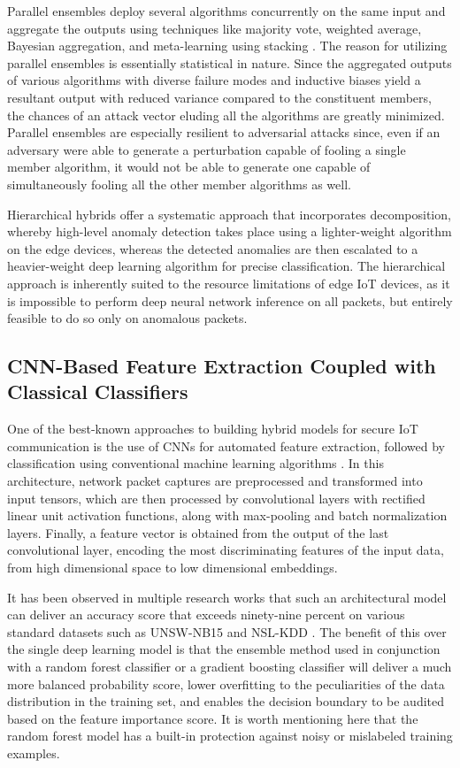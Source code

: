 \documentclass[12pt]{article}
\begin{document}
Parallel ensembles deploy several algorithms concurrently on the same input and aggregate the outputs using techniques like majority vote, weighted average, Bayesian aggregation, and meta-learning using stacking \cite{mirsky2018kitsune}. The reason for utilizing parallel ensembles is essentially statistical in nature. Since the aggregated outputs of various algorithms with diverse failure modes and inductive biases yield a resultant output with reduced variance compared to the constituent members, the chances of an attack vector eluding all the algorithms are greatly minimized. Parallel ensembles are especially resilient to adversarial attacks since, even if an adversary were able to generate a perturbation capable of fooling a single member algorithm, it would not be able to generate one capable of simultaneously fooling all the other member algorithms as well.

Hierarchical hybrids offer a systematic approach that incorporates decomposition, whereby high-level anomaly detection takes place using a lighter-weight algorithm on the edge devices, whereas the detected anomalies are then escalated to a heavier-weight deep learning algorithm for precise classification. The hierarchical approach is inherently suited to the resource limitations of edge IoT devices, as it is impossible to perform deep neural network inference on all packets, but entirely feasible to do so only on anomalous packets.

\subsection{CNN-Based Feature Extraction Coupled with Classical Classifiers}

One of the best-known approaches to building hybrid models for secure IoT communication is the use of CNNs for automated feature extraction, followed by classification using conventional machine learning algorithms \cite{ferrag2020deep}. In this architecture, network packet captures are preprocessed and transformed into input tensors, which are then processed by convolutional layers with rectified linear unit activation functions, along with max-pooling and batch normalization layers. Finally, a feature vector is obtained from the output of the last convolutional layer, encoding the most discriminating features of the input data, from high dimensional space to low dimensional embeddings.

It has been observed in multiple research works that such an architectural model can deliver an accuracy score that exceeds ninety-nine percent on various standard datasets such as UNSW-NB15 and NSL-KDD \cite{vinayakumar2019deep}. The benefit of this over the single deep learning model is that the ensemble method used in conjunction with a random forest classifier or a gradient boosting classifier will deliver a much more balanced probability score, lower overfitting to the peculiarities of the data distribution in the training set, and enables the decision boundary to be audited based on the feature importance score. It is worth mentioning here that the random forest model has a built-in protection against noisy or mislabeled training examples.
\end{document}
